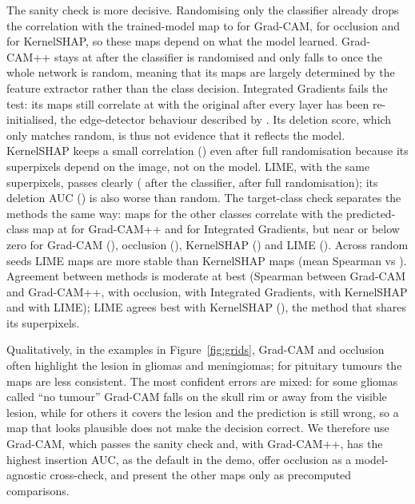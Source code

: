\documentclass[11pt,a4paper]{article}
\begin{document}
The sanity check is more decisive. Randomising only the classifier already drops the correlation with the trained-model map to \SanClsGradcam{} for Grad-CAM, \SanClsOcclusion{} for occlusion and \SanClsKernelShap{} for KernelSHAP, so these maps depend on what the model learned. Grad-CAM++ stays at \SanClsGradcamPP{} after the classifier is randomised and only falls to \SanAllGradcamPP{} once the whole network is random, meaning that its maps are largely determined by the feature extractor rather than the class decision. Integrated Gradients fails the test: its maps still correlate at \SanAllIntegratedGradients{} with the original after every layer has been re-initialised, the edge-detector behaviour described by \citet{adebayo2018}. Its deletion score, which only matches random, is thus not evidence that it reflects the model. KernelSHAP keeps a small correlation (\SanAllKernelShap{}) even after full randomisation because its superpixels depend on the image, not on the model. LIME, with the same superpixels, passes clearly (\SanClsLime{} after the classifier, \SanAllLime{} after full randomisation); its deletion AUC (\DelLime{}) is also worse than random. The target-class check separates the methods the same way: maps for the other classes correlate with the predicted-class map at \ClsGradcamPP{} for Grad-CAM++ and \ClsIntegratedGradients{} for Integrated Gradients, but near or below zero for Grad-CAM (\ClsGradcam{}), occlusion (\ClsOcclusion{}), KernelSHAP (\ClsKernelShap{}) and LIME (\ClsLime{}). Across random seeds LIME maps are more stable than KernelSHAP maps (mean Spearman \StabLime{} vs \StabShap{}). Agreement between methods is moderate at best (Spearman \AgGcPP{} between Grad-CAM and Grad-CAM++, \AgGcOcc{} with occlusion, \AgGcIG{} with Integrated Gradients, \AgGcShap{} with KernelSHAP and \AgGcLime{} with LIME); LIME agrees best with KernelSHAP (\AgLimeShap{}), the method that shares its superpixels.

Qualitatively, in the examples in Figure~\ref{fig:grids}, Grad-CAM and occlusion often highlight the lesion in gliomas and meningiomas; for pituitary tumours the maps are less consistent. The most confident errors are mixed: for some gliomas called ``no tumour'' Grad-CAM falls on the skull rim or away from the visible lesion, while for others it covers the lesion and the prediction is still wrong, so a map that looks plausible does not make the decision correct. We therefore use Grad-CAM, which passes the sanity check and, with Grad-CAM++, has the highest insertion AUC, as the default in the demo, offer occlusion as a model-agnostic cross-check, and present the other maps only as precomputed comparisons.
\end{document}
